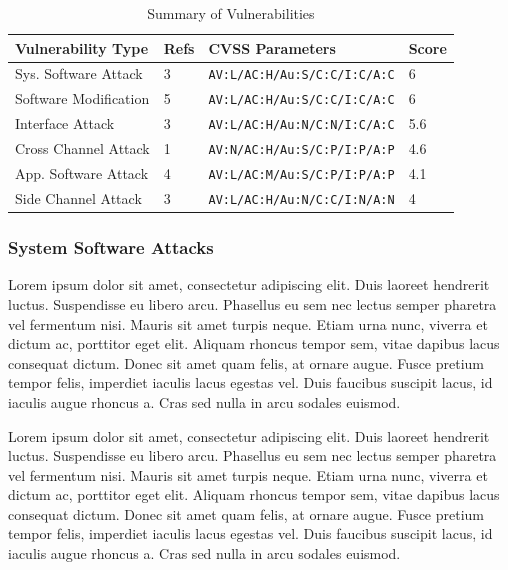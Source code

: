 \documentclass[final,conference,11pt]{IEEEtran}
\begin{document}
\begin{table}[!t]
\renewcommand{\arraystretch}{1.3}
\caption{Summary of Vulnerabilities}
\label{tab:vul_summary}
\tiny
\centering
\begin{tabular}{ | l | l | l | l | }
\hline
 Vulnerability Type & Refs & CVSS Parameters & Score \\ \hline
 Sys. Software Attack	& 3 &	\verb|AV:L/AC:H/Au:S/C:C/I:C/A:C| 	& 6		\\ \hline
 Software Modification	& 5 &	\verb|AV:L/AC:H/Au:S/C:C/I:C/A:C|	& 6		\\ \hline
 Interface Attack		& 3	&	\verb|AV:L/AC:H/Au:N/C:N/I:C/A:C|	& 5.6	\\ \hline
 Cross Channel Attack	& 1 &	\verb|AV:N/AC:H/Au:S/C:P/I:P/A:P|	& 4.6	\\ \hline
 App. Software Attack	& 4 &	\verb|AV:L/AC:M/Au:S/C:P/I:P/A:P|	& 4.1	\\ \hline
 Side Channel Attack		& 3 &	\verb|AV:L/AC:H/Au:N/C:C/I:N/A:N|	& 4		\\ \hline
\end{tabular}
\end{table}

\subsubsection{System Software Attacks}
Lorem ipsum dolor sit amet, consectetur adipiscing elit. Duis laoreet hendrerit luctus. Suspendisse eu libero arcu. Phasellus eu sem nec lectus semper pharetra vel fermentum nisi. Mauris sit amet turpis neque. Etiam urna nunc, viverra et dictum ac, porttitor eget elit. Aliquam rhoncus tempor sem, vitae dapibus lacus consequat dictum. Donec sit amet quam felis, at ornare augue. Fusce pretium tempor felis, imperdiet iaculis lacus egestas vel. Duis faucibus suscipit lacus, id iaculis augue rhoncus a. Cras sed nulla in arcu sodales euismod.

Lorem ipsum dolor sit amet, consectetur adipiscing elit. Duis laoreet hendrerit luctus. Suspendisse eu libero arcu. Phasellus eu sem nec lectus semper pharetra vel fermentum nisi. Mauris sit amet turpis neque. Etiam urna nunc, viverra et dictum ac, porttitor eget elit. Aliquam rhoncus tempor sem, vitae dapibus lacus consequat dictum. Donec sit amet quam felis, at ornare augue. Fusce pretium tempor felis, imperdiet iaculis lacus egestas vel. Duis faucibus suscipit lacus, id iaculis augue rhoncus a. Cras sed nulla in arcu sodales euismod.
\end{document}
